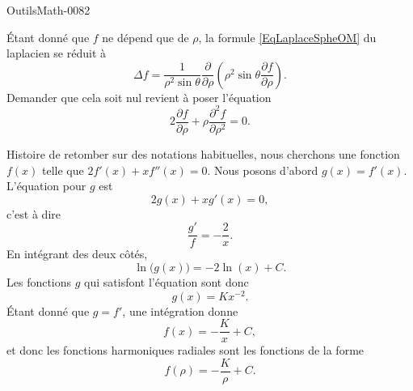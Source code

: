 
\begin{corrige}{OutilsMath-0082}

    Étant donné que $f$ ne dépend que de $\rho$, la formule \eqref{EqLaplaceSpheOM} du laplacien se réduit à
    \begin{equation}
        \Delta f=\frac{1}{ \rho^2\sin\theta }\frac{ \partial  }{ \partial \rho }\left( \rho^2\sin\theta\frac{ \partial f }{ \partial \rho } \right).
    \end{equation}
    Demander que cela soit nul revient à poser l'équation
    \begin{equation}
        2\frac{ \partial f }{ \partial \rho }+\rho\frac{ \partial^2f }{ \partial \rho^2 }=0.
    \end{equation}
    
    Histoire de retomber sur des notations habituelles, nous cherchons une fonction $f(x)$ telle que $2f'(x)+xf''(x)=0$. Nous posons d'abord $g(x)=f'(x)$. L'équation pour $g$ est
    \begin{equation}
        2g(x)+xg'(x)=0,
    \end{equation}
    c'est à dire
    \begin{equation}
        \frac{ g' }{ f }=-\frac{ 2 }{ x }.
    \end{equation}
    En intégrant des deux côtés,
    \begin{equation}
        \ln\big( g(x) \big)=-2\ln(x)+C.
    \end{equation}
    Les fonctions $g$ qui satisfont l'équation sont donc
    \begin{equation}
        g(x)=Kx^{-2}.
    \end{equation}
    Étant donné que $g=f'$, une intégration donne
    \begin{equation}
        f(x)=-\frac{ K }{ x }+C,
    \end{equation}
    et donc les fonctions harmoniques radiales sont les fonctions de la forme
    \begin{equation}
        f(\rho)=-\frac{ K }{ \rho }+C.
    \end{equation}

\end{corrige}
